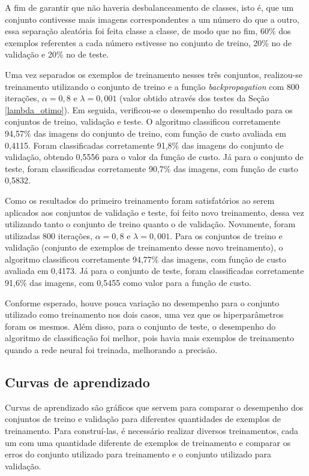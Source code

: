 \documentclass[12pt]{article}
\begin{document}
A fim de garantir que não haveria desbalanceamento de classes, isto é, que um conjunto contivesse mais imagens correspondentes a um número do que a outro, essa separação aleatória foi feita classe a classe, de modo que no fim, 60\% dos exemplos referentes a cada número estivesse no conjunto de treino, 20\% no de validação e 20\% no de teste.

Uma vez separados os exemplos de treinamento nesses três conjuntos, realizou-se treinamento utilizando o conjunto de treino e a função \textit{backpropagation} com 800 iterações, $\alpha = 0,8$ e $\lambda=0,001$ (valor obtido através dos testes da Seção \ref{lambda_otimo}). Em seguida, verificou-se o desempenho do resultado para os conjuntos de treino, validação e teste. O algoritmo classificou corretamente 94,57\% das imagens do conjunto de treino, com função de custo avaliada em 0,4115. Foram classificadas corretamente 91,8\% das imagens do conjunto de validação, obtendo 0,5556 para o valor da função de custo. Já para o conjunto de teste, foram classificadas corretamente 90,7\% das imagens, com função de custo 0,5832.

Como os resultados do primeiro treinamento foram satisfatórios ao serem aplicados aos conjuntos de validação e teste, foi feito novo treinamento, dessa vez utilizando tanto o conjunto de treino quanto o de validação. Novamente, foram utilizadas 800 iterações, $\alpha = 0,8$ e $\lambda=0,001$. Para os conjuntos de treino e validação (conjunto de exemplos de treinamento desse novo treinamento), o algoritmo classificou corretamente 94,77\% das imagens, com função de custo avaliada em 0,4173. Já para o conjunto de teste, foram classificadas corretamente 91,6\% das imagens, com 0,5455 como valor para a função de custo.

Conforme esperado, houve pouca variação no desempenho para o conjunto utilizado como treinamento nos dois casos, uma vez que os hiperparâmetros foram os mesmos. Além disso, para o conjunto de teste, o desempenho do algoritmo de classificação foi melhor, pois havia mais exemplos de treinamento quando a rede neural foi treinada, melhorando a precisão.

\subsection{Curvas de aprendizado}
Curvas de aprendizado são gráficos que servem para comparar o desempenho dos conjuntos de treino e validação para diferentes quantidades de exemplos de treinamento. Para construí-las, é necessário realizar diversos treinamentos, cada um com uma quantidade diferente de exemplos de treinamento e comparar os erros do conjunto utilizado para treinamento e o conjunto utilizado para validação.
\end{document}
